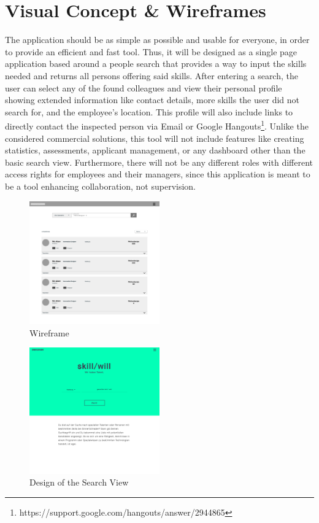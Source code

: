 \section{Visual Concept \& Wireframes}
The application should be as simple as possible and usable for everyone, in order to provide an efficient and fast tool. Thus, it will be designed as a single page application based around a people search that provides a way to input the skills needed and returns all persons offering said skills. After entering a search, the user can select any of the found colleagues and view their personal profile showing extended information like contact details, more skills the user did not search for, and the employee's location. This profile will also include links to directly contact the inspected person via Email or Google Hangouts\footnote{https://support.google.com/hangouts/answer/2944865}. Unlike the considered commercial solutions, this tool will not include features like creating statistics, assessments, applicant management, or any dashboard other than the basic search view.
Furthermore, there will not be any different roles with different access rights for employees and their managers, since this application is meant to be a tool enhancing collaboration, not supervision.
\begin{figure}[!htp]
    \centering
    \includegraphics[width=0.5\textwidth]{images/wireframe.png}
    \caption{Wireframe}
    \label{fig:wireframe}
\end{figure}

\begin{figure}[!htp]
    \centering
    \includegraphics[width=0.5\textwidth]{images/design_home.png}
    \caption[Home View Design]{Design of the Search View}
    \label{fig:design_home}
\end{figure}

